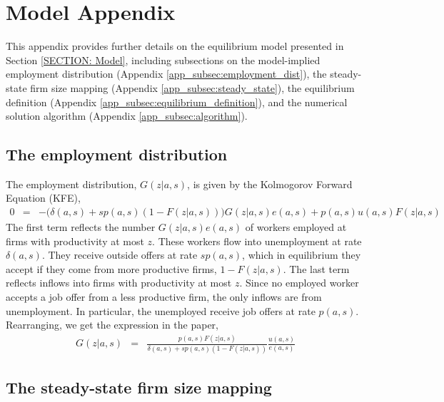
\section{Model Appendix\label{APPENDIX: Model}}

This appendix provides further details on the equilibrium model presented in Section \ref{SECTION: Model}, including subsections on %
%
the model-implied employment distribution (Appendix \ref{app_subsec:employment_dist}), %
%
the steady-state firm size mapping (Appendix \ref{app_subsec:steady_state}), %
%
the equilibrium definition (Appendix \ref{app_subsec:equilibrium_definition}), %
%
and the numerical solution algorithm (Appendix \ref{app_subsec:algorithm}).




\clearpage
\subsection{The employment distribution\label{app_subsec:employment_dist}}

The employment distribution, $G(z|a,s)$, is given by the Kolmogorov Forward Equation (KFE),
%
\begin{eqnarray*}
  0 &=& - \Big(\delta(a,s)+sp(a,s)(1-F(z|a,s))\Big) G(z|a,s)e(a,s) + p(a,s)u(a,s)F(z|a,s)
\end{eqnarray*}
%
The first term reflects the number $G(z|a,s)e(a,s)$ of workers employed at firms with productivity at most $z$. These workers flow into unemployment at rate $\delta(a,s)$. They receive outside offers at rate $sp(a,s)$, which in equilibrium they accept if they come from more productive firms, $1-F(z|a,s)$. The last term reflects inflows into firms with productivity at most $z$. Since no employed worker accepts a job offer from a less productive firm, the only inflows are from unemployment. In particular, the unemployed receive job offers at rate $p(a,s)$. Rearranging, we get the expression in the paper,
\begin{eqnarray*}
G(z|a,s) &=& \frac{ p(a,s)F(z|a,s)}{\delta(a,s)+sp(a,s)(1-F(z|a,s))} \frac{u(a,s)}{e(a,s)}
\end{eqnarray*}




\clearpage
\subsection{The steady-state firm size mapping\label{app_subsec:steady_state}}

